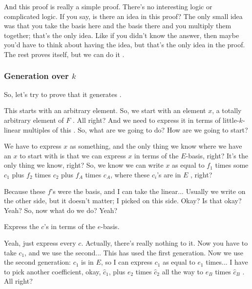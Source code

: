 \begin{proofWrapper}
\begin{speech}[00:29:44 - 00:30:46]
And this proof is really a simple proof. There's no interesting logic or complicated logic. If you say, is there an idea in this proof? The only small idea was that you take the basis here and the basis there and you multiply them together; that's the only idea. Like if you didn't know the answer, then maybe you'd have to think about having the idea, but that's the only idea in the proof. The rest proves itself, but we can do it .
\end{speech}

\subsubsection{Generation over \texorpdfstring{$k$}{k}}

\begin{speech}[00:30:47 - 00:32:08]
So, let's try to prove that it generates .

This starts with an arbitrary element. So, we start with an element $x$, a totally arbitrary element of $F$ . All right? And we need to express it in terms of little-$k$-linear multiples of this . So, what are we going to do? How are we going to start?

We have to express $x$ as something, and the only thing we know where we have an $x$ to start with is that we can express $x$ in terms of the $E$-basis, right? It's the only thing we know, right? So, we know we can write $x$ as equal to $f_1$ times some $c_1$ plus $f_2$ times $c_2$ plus $f_A$ times $c_A$, where these $c_i$'s are in $E$ , right?

Because these $f$'s were the basis, and I can take the linear... Usually we write on the other side, but it doesn't matter; I picked on this side. Okay? Is that okay? Yeah? So, now what do we do? Yeah?
\end{speech}

\begin{student}
Express the $c$'s in terms of the $e$-basis.
\end{student}

\begin{speech}[00:32:10 - 00:33:54]
Yeah, just express every $c$. Actually, there's really nothing to it. Now you have to take $c_1$, and we use the second... This has used the first generation. Now we use the second generation: $c_1$ is in $E$, so I can express $c_1$ as equal to $e_1$ times... I have to pick another coefficient, okay, $\hat{c}_1$, plus $e_2$ times $\hat{c}_2$ all the way to $e_B$ times $\hat{c}_B$ . All right?


\end{speech}
\end{proofWrapper}
